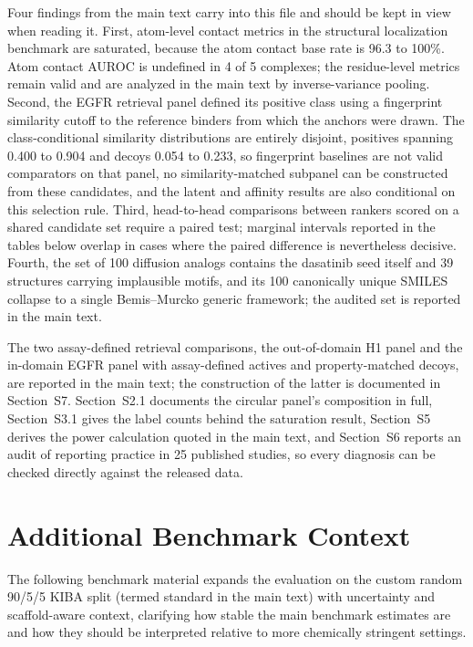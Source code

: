 \documentclass[11pt]{article}
\begin{document}
Four findings from the main text carry into this file and should be kept in view when reading it. First, atom-level contact metrics in the structural localization benchmark are saturated, because the atom contact base rate is 96.3 to 100\%. Atom contact AUROC is undefined in 4 of 5 complexes; the residue-level metrics remain valid and are analyzed in the main text by inverse-variance pooling. Second, the EGFR retrieval panel defined its positive class using a fingerprint similarity cutoff to the reference binders from which the anchors were drawn. The class-conditional similarity distributions are entirely disjoint, positives spanning 0.400 to 0.904 and decoys 0.054 to 0.233, so fingerprint baselines are not valid comparators on that panel, no similarity-matched subpanel can be constructed from these candidates, and the latent and affinity results are also conditional on this selection rule. Third, head-to-head comparisons between rankers scored on a shared candidate set require a paired test; marginal intervals reported in the tables below overlap in cases where the paired difference is nevertheless decisive. Fourth, the set of 100 diffusion analogs contains the dasatinib seed itself and 39 structures carrying implausible motifs, and its 100 canonically unique SMILES collapse to a single Bemis--Murcko generic framework; the audited set is reported in the main text.

The two assay-defined retrieval comparisons, the out-of-domain H1 panel and the in-domain EGFR panel with assay-defined actives and property-matched decoys, are reported in the main text; the construction of the latter is documented in Section~S7. Section~S2.1 documents the circular panel's composition in full, Section~S3.1 gives the label counts behind the saturation result, Section~S5 derives the power calculation quoted in the main text, and Section~S6 reports an audit of reporting practice in 25 published studies, so every diagnosis can be checked directly against the released data.

\section{Additional Benchmark Context}
The following benchmark material expands the evaluation on the custom random 90/5/5 KIBA split (termed standard in the main text) with uncertainty and scaffold-aware context, clarifying how stable the main benchmark estimates are and how they should be interpreted relative to more chemically stringent settings.
\end{document}

